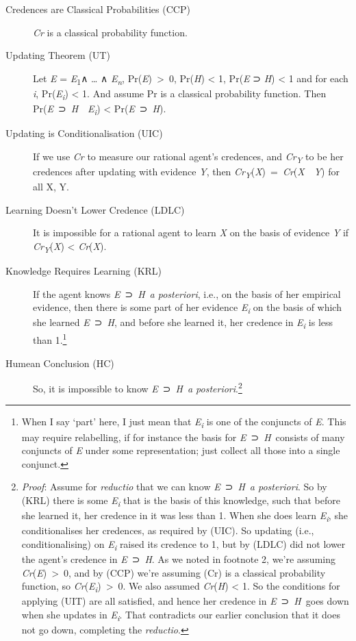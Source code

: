 \documentclass[
  10pt,
  letterpaper,
  DIV=11,
  numbers=noendperiod,
  twoside]{scrartcl}
\begin{document}
\begin{description}
\item[Credences are Classical Probabilities (CCP)]
\emph{Cr} is a classical probability function.
\item[Updating Theorem (UT)]
Let \emph{E} = \emph{E}\textsubscript{1}∧ \ldots{} ∧
\emph{E\textsubscript{n}}, Pr(\emph{E})~\textgreater~0, Pr(\emph{H})
\textless{} 1, Pr(\emph{E} ⊃ \emph{H}) \textless{} 1 and for each
\emph{i}, Pr(\emph{E\textsubscript{i}}) \textless{} 1. And assume Pr is
a classical probability function. Then
Pr(\emph{E}~⊃~\emph{H}~\textbar~\emph{E\textsubscript{i}}) \textless{}
Pr(\emph{E}~⊃~\emph{H}).
\item[Updating is Conditionalisation (UIC)]
If we use \emph{Cr} to measure our rational agent's credences, and
\emph{Cr\textsubscript{Y}} to be her credences after updating with
evidence \emph{Y}, then
\emph{Cr\textsubscript{Y}}(\emph{X})~=~\emph{Cr}(\emph{X}~\textbar~\emph{Y})
for all X, Y.
\item[Learning Doesn't Lower Credence (LDLC)]
It is impossible for a rational agent to learn \emph{X} on the basis of
evidence \emph{Y} if \emph{Cr\textsubscript{Y}}(\emph{X}) \textless{}
\emph{Cr}(\emph{X}).
\item[Knowledge Requires Learning (KRL)]
If the agent knows \emph{E}~⊃~\emph{H}~\emph{a posteriori}, i.e., on the
basis of her empirical evidence, then there is some part of her evidence
\emph{E\textsubscript{i}} on the basis of which she learned
\emph{E}~⊃~\emph{H}, and before she learned it, her credence in
\emph{E\textsubscript{i}} is less than 1.\footnote{When I say `part'
  here, I just mean that \emph{E\textsubscript{i}} is one of the
  conjuncts of \emph{E}. This may require relabelling, if for instance
  the basis for \emph{E}~⊃~\emph{H}~consists of many conjuncts of
  \emph{E} under some representation; just collect all those into a
  single conjunct.}
\item[Humean Conclusion (HC)]
So, it is impossible to know \emph{E}~⊃~\emph{H}~\emph{a
posteriori}.\footnote{\emph{Proof}: Assume for \emph{reductio} that we
  can know \emph{E}~⊃~\emph{H}~\emph{a posteriori}. So by (KRL) there is
  some \emph{E\textsubscript{i}} that is the basis of this knowledge,
  such that before she learned it, her credence in it was less than 1.
  When she does learn \emph{E\textsubscript{i}}, she conditionalises her
  credences, as required by (UIC). So updating (i.e., conditionalising)
  on \emph{E\textsubscript{i}} raised its credence to 1, but by (LDLC)
  did not lower the agent's credence in \emph{E}~⊃~\emph{H}. As we noted
  in footnote 2, we're assuming \emph{Cr}(\emph{E})~\textgreater~0, and
  by (CCP) we're assuming (Cr) is a classical probability function, so
  \emph{Cr}(\emph{E\textsubscript{i}})~\textgreater~0. We also assumed
  \emph{Cr}(\emph{H}) \textless{} 1. So the conditions for applying
  (UIT) are all satisfied, and hence her credence in
  \emph{E}~⊃~\emph{H}~goes down when she updates in
  \emph{E\textsubscript{i}}. That contradicts our earlier conclusion
  that it does not go down, completing the \emph{reductio}.}
\end{description}
\end{document}
